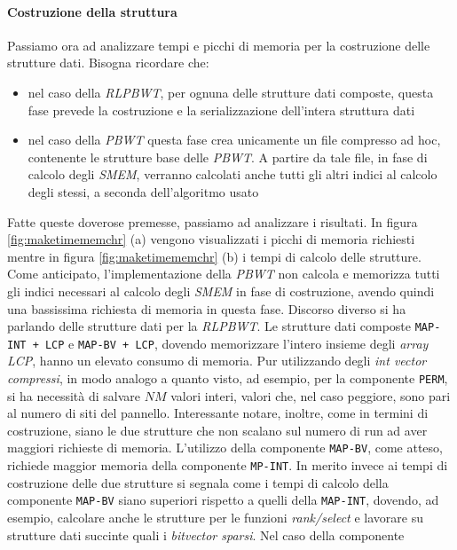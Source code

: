 \paragraph{Costruzione della struttura}
Passiamo ora ad analizzare tempi e picchi di memoria per la costruzione delle
strutture dati. Bisogna ricordare che:
\begin{itemize}
  \item nel caso della \textit{RLPBWT}, per ognuna delle strutture dati
  composte, questa fase prevede la costruzione e la 
  serializzazione dell'intera struttura dati
  \item nel caso della \textit{PBWT} questa fase crea unicamente un file
  compresso ad hoc, contenente le strutture base delle \textit{PBWT}. A partire
  da tale file, in fase di calcolo degli \textit{SMEM}, verranno calcolati anche
  tutti gli altri indici al calcolo degli stessi, a seconda dell'algoritmo usato
\end{itemize}
Fatte queste doverose premesse, passiamo ad analizzare i risultati.
In figura \ref{fig:maketimememchr} (a) vengono visualizzati i picchi di
memoria richiesti mentre in figura \ref{fig:maketimememchr} (b) i tempi di
calcolo delle strutture.\\ 
Come anticipato, l'implementazione della \textit{PBWT} non calcola e memorizza
tutti gli indici 
necessari al calcolo degli \textit{SMEM} in fase di costruzione, avendo quindi
una bassissima richiesta di memoria in questa fase. Discorso diverso si ha
parlando delle strutture dati per la \textit{RLPBWT}. Le strutture dati composte
\texttt{MAP-INT + LCP} e \texttt{MAP-BV + LCP}, dovendo 
memorizzare l'intero insieme degli \textit{array LCP}, hanno un elevato
consumo di memoria. Pur utilizzando degli \textit{int vector compressi}, in modo
analogo a quanto visto, ad esempio, per la componente \texttt{PERM}, si ha
necessità di salvare $NM$ valori interi, valori che, nel caso peggiore, sono
pari al numero di siti del pannello. Interessante notare, inoltre, come in
termini di costruzione, siano le due strutture che non scalano sul numero di run
ad aver maggiori richieste di memoria. L'utilizzo della componente
\texttt{MAP-BV}, come atteso, richiede maggior memoria della componente
\texttt{MP-INT}. In merito invece ai tempi di costruzione delle due strutture si
segnala come i tempi di calcolo della componente \texttt{MAP-BV} siano superiori
rispetto a quelli della \texttt{MAP-INT}, dovendo, ad esempio, calcolare
anche le strutture per le funzioni \textit{rank/select} e lavorare su strutture
dati succinte quali i \textit{bitvector sparsi}. Nel caso della componente
